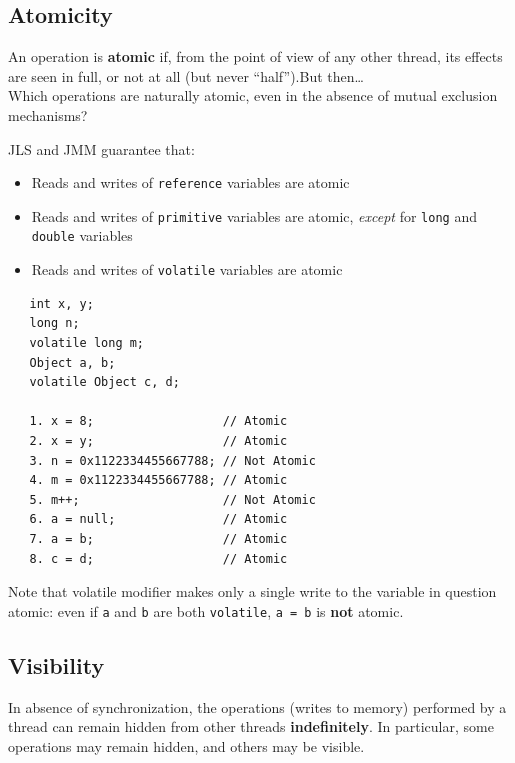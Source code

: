 \subsection{Atomicity}
An operation is \textbf{atomic} if, from the point of view of any other thread, its effects are seen in full, or not at all (but never ``half'').But then\dots\\
Which operations are naturally atomic, even in the absence of mutual
exclusion mechanisms?\\
{JLS and JMM guarantee that:\ns
\begin{itemize}
   \item Reads and writes of \texttt{reference} variables are atomic
   \item Reads and writes of \texttt{primitive} variables are atomic, \textit{except} for \texttt{long} and \texttt{double} variables
   \item Reads and writes of \texttt{volatile} variables are atomic
\end{itemize}}

\begin{lstlisting}
   int x, y;
   long n;
   volatile long m;
   Object a, b;
   volatile Object c, d;
   
   1. x = 8;                  // Atomic
   2. x = y;                  // Atomic
   3. n = 0x1122334455667788; // Not Atomic
   4. m = 0x1122334455667788; // Atomic
   5. m++;                    // Not Atomic
   6. a = null;               // Atomic
   7. a = b;                  // Atomic
   8. c = d;                  // Atomic
\end{lstlisting}

Note that volatile modifier makes only a single write to
the variable in question atomic:
even if \lstinline|a| and \lstinline|b| are both \lstinline|volatile|, \lstinline|a = b| is \textbf{not} atomic.

\subsection{Visibility}
In absence of synchronization, the operations (writes to memory)
performed by a thread can remain hidden from other threads \textbf{indefinitely}.
In particular, some operations may remain hidden, and others may be
visible.

